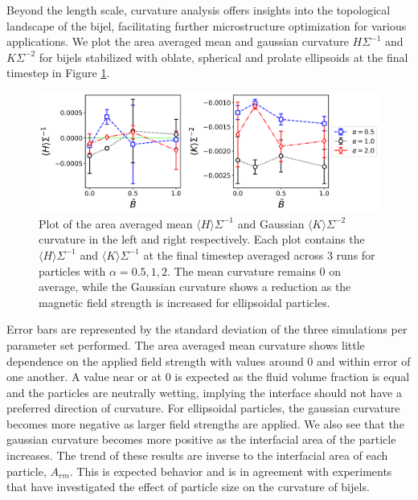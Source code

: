 Beyond the length scale, curvature analysis offers insights into the
topological landscape of the bijel, facilitating further
microstructure optimization for various applications.
\cite{reeves_quantitative_2016} We plot the area averaged mean and
gaussian curvature \(H\Sigma^{-1}\) and \(K\Sigma^{-2}\) for bijels
stabilized with oblate, spherical and prolate ellipsoids at the final timestep in Figure
\ref{fig:curvature-vs-B_ss}. 

\begin{figure} 
    \centering 
    \includegraphics[scale = 0.4]{figures/results/paper1/curvature-vs-B_ss.png} 
    \caption{Plot of the area averaged mean $\langle H \rangle \Sigma^{-1}$ and Gaussian 
            $\langle K \rangle \Sigma^{-2}$ curvature in the left and right respectively. Each 
            plot contains the $\langle H \rangle \Sigma^{-1}$ and $\langle K \rangle \Sigma^{-1}$ 
            at the final timestep averaged across 3 runs for particles with $\alpha = 0.5, 1, 2$. 
            The mean curvature remains 0 on average, while the Gaussian 
            curvature shows a reduction as the magnetic field strength is increased for 
            ellipsoidal particles.} 
    \label{fig:curvature-vs-B_ss}
\end{figure}

Error bars are represented by the standard
deviation of the three simulations per parameter set performed. The area
averaged mean curvature shows little dependence on the applied field
strength with values around 0 and within error of one another. A value
near or at 0 is expected as the fluid volume fraction is equal and the
particles are neutrally wetting, implying the interface should not have
a preferred direction of curvature. \cite{jinnai_interfacial_2001} For
ellipsoidal particles, the gaussian curvature becomes more negative as
larger field strengths are applied. We also see that the gaussian
curvature becomes more positive as the interfacial area of the particle
increases. The trend of these results are inverse to the interfacial
area of each particle, \(A_{rm}\). This is expected behavior and is in
agreement with experiments that have investigated the effect of particle
size on the curvature of bijels. \cite{reeves_quantitative_2016}

